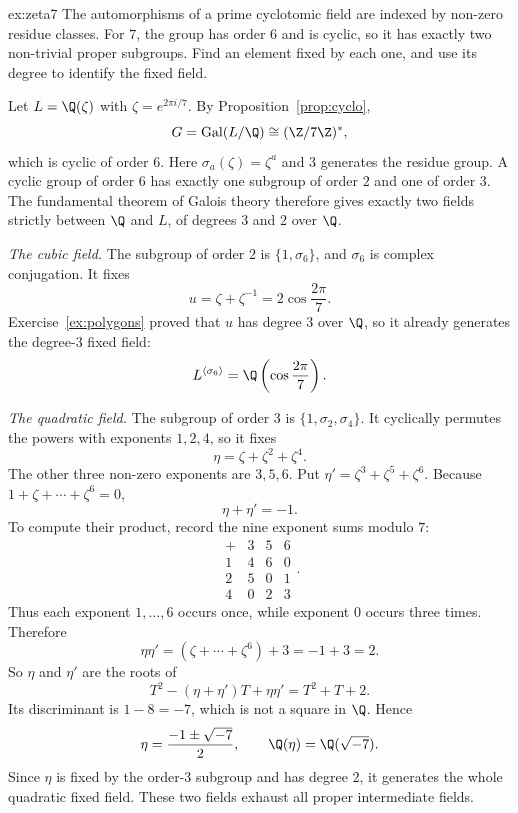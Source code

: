 \begin{solution}{ex:zeta7}
\idea The automorphisms of a prime cyclotomic field are indexed by non-zero residue classes. For $7$, the group has order $6$ and is cyclic, so it has exactly two non-trivial proper subgroups. Find an element fixed by each one, and use its degree to identify the fixed field.

\writeup Let $L=\Q(\zeta)$ with $\zeta=e^{2\pi i/7}$. By Proposition~\ref{prop:cyclo},
\[
G=\operatorname{Gal}(L/\Q)\cong(\Z/7\Z)^*,
\]
which is cyclic of order $6$. Here $\sigma_a(\zeta)=\zeta^a$ and $3$ generates the residue group. A cyclic group of order $6$ has exactly one subgroup of order $2$ and one of order $3$. The fundamental theorem of Galois theory therefore gives exactly two fields strictly between $\Q$ and $L$, of degrees $3$ and $2$ over $\Q$.

\emph{The cubic field.} The subgroup of order $2$ is $\{1,\sigma_6\}$, and $\sigma_6$ is complex conjugation. It fixes
\[
u=\zeta+\zeta^{-1}=2\cos\frac{2\pi}{7}.
\]
Exercise~\ref{ex:polygons} proved that $u$ has degree $3$ over $\Q$, so it already generates the degree-$3$ fixed field:
\[
L^{\langle\sigma_6\rangle}=\Q\left(\cos\frac{2\pi}{7}\right).
\]

\emph{The quadratic field.} The subgroup of order $3$ is $\{1,\sigma_2,\sigma_4\}$. It cyclically permutes the powers with exponents $1,2,4$, so it fixes
\[
\eta=\zeta+\zeta^2+\zeta^4.
\]
The other three non-zero exponents are $3,5,6$. Put $\eta'=\zeta^3+\zeta^5+\zeta^6$. Because $1+\zeta+\cdots+\zeta^6=0$,
\[
\eta+\eta'=-1.
\]
To compute their product, record the nine exponent sums modulo $7$:
\[
\begin{array}{c|ccc}
+&3&5&6\\\hline
1&4&6&0\\
2&5&0&1\\
4&0&2&3
\end{array}.
\]
Thus each exponent $1,\ldots,6$ occurs once, while exponent $0$ occurs three times. Therefore
\[
\eta\eta'=(\zeta+\cdots+\zeta^6)+3=-1+3=2.
\]
So $\eta$ and $\eta'$ are the roots of
\[
T^2-(\eta+\eta')T+\eta\eta'=T^2+T+2.
\]
Its discriminant is $1-8=-7$, which is not a square in $\Q$. Hence
\[
\eta=\frac{-1\pm\sqrt{-7}}{2},\qquad
\Q(\eta)=\Q(\sqrt{-7}).
\]
Since $\eta$ is fixed by the order-$3$ subgroup and has degree $2$, it generates the whole quadratic fixed field. These two fields exhaust all proper intermediate fields.
\end{solution}


